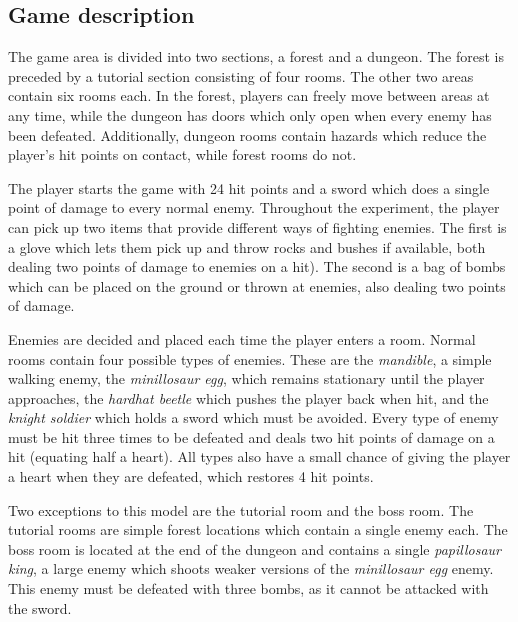 \documentclass[a4paper]{article}
\begin{document}
\begin{multicols*}{2}
\subsection{Game description}
The game area is divided into two sections, a forest and a dungeon. The forest is preceded by a tutorial section consisting of four rooms. The other two areas contain six rooms each. In the forest, players can freely move between areas at any time, while the dungeon has doors which only open when every enemy has been defeated. Additionally, dungeon rooms contain hazards which reduce the player's hit points on contact, while forest rooms do not.

The player starts the game with 24 hit points and a sword which does a single point of damage to every normal enemy. Throughout the experiment, the player can pick up two items that provide different ways of fighting enemies. The first is a glove which lets them pick up and throw rocks and bushes if available, both dealing two points of damage to enemies on a hit). The second is a bag of bombs which can be placed on the ground or thrown at enemies, also dealing two points of damage. 

Enemies are decided and placed each time the player enters a room. Normal rooms contain four possible types of enemies. These are the \emph{mandible}, a simple walking enemy, the \emph{minillosaur egg}, which remains stationary until the player approaches, the \emph{hardhat beetle} which pushes the player back when hit, and the \emph{knight soldier} which holds a sword which must be avoided. Every type of enemy must be hit three times to be defeated and deals two hit points of damage on a hit (equating half a heart). All types also have a small chance of giving the player a heart when they are defeated, which restores 4 hit points.

Two exceptions to this model are the tutorial room and the boss room. The tutorial rooms are simple forest locations which contain a single enemy each. The boss room is located at the end of the dungeon and contains a single \emph{papillosaur king}, a large enemy which shoots weaker versions of the \emph{minillosaur egg} enemy. This enemy must be defeated with three bombs, as it cannot be attacked with the sword.


\end{multicols*}
\end{document}
